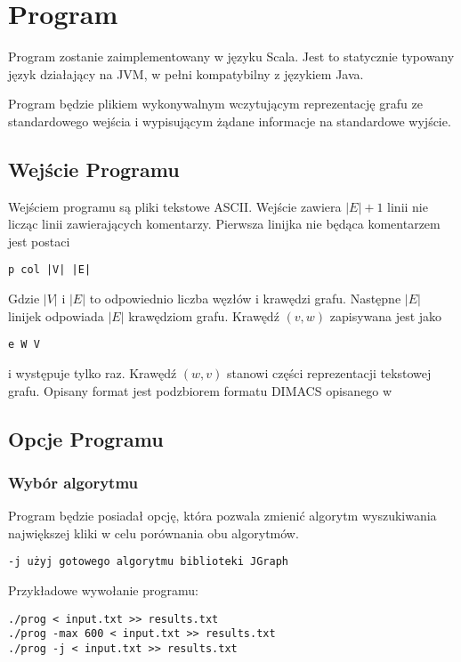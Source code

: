 \documentclass[12pt, a4paper]{article}
\begin{document}
\section{Program}
\label{sec-3}
Program zostanie zaimplementowany w języku Scala. Jest to statycznie typowany język działający na JVM, w pełni kompatybilny z językiem Java.

Program będzie plikiem wykonywalnym wczytującym reprezentację grafu ze standardowego wejścia i wypisującym żądane informacje na standardowe wyjście.

\subsection{Wejście Programu}

Wejściem programu są pliki tekstowe ASCII. Wejście zawiera $|E|+1$ linii nie licząc linii zawierających komentarzy. Pierwsza linijka nie będąca komentarzem jest postaci 
\begin{verbatim}
p col |V| |E|
\end{verbatim}
Gdzie $|V|$ i $|E|$ to odpowiednio liczba węzłów i krawędzi grafu. Następne $|E|$ linijek odpowiada $|E|$ krawędziom grafu. Krawędź $(v, w)$ zapisywana jest jako 
\begin{verbatim}
e W V
\end{verbatim}
i występuje tylko raz. Krawędź $(w, v)$ stanowi części reprezentacji tekstowej grafu. Opisany format jest podzbiorem formatu DIMACS opisanego w \cite{dimacs_format}

\subsection{Opcje Programu}

\subsubsection{Wybór algorytmu}
Program będzie posiadał opcję, która pozwala zmienić algorytm wyszukiwania największej kliki w celu porównania obu algorytmów.

\begin{verbatim}
-j użyj gotowego algorytmu biblioteki JGraph
\end{verbatim}
Przykładowe wywołanie programu:

\begin{verbatim}
./prog < input.txt >> results.txt
./prog -max 600 < input.txt >> results.txt
./prog -j < input.txt >> results.txt
\end{verbatim}
\end{document}
